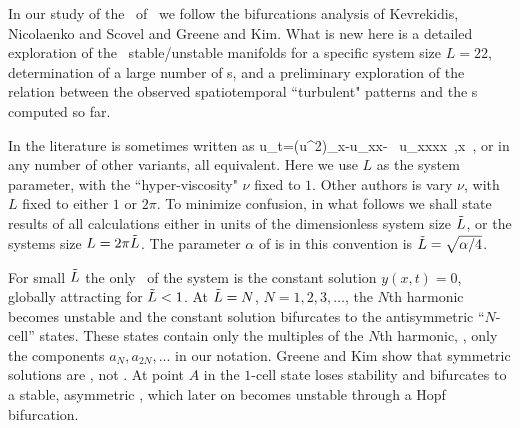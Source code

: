 In our study of the \eqva\ of
\KSe\ we follow the bifurcations analysis of
Kevrekidis, Nicolaenko and Scovel 
and
Greene and Kim. What is new here is
a detailed exploration of the \eqva\ stable/unstable manifolds
for a specific system size $L = 22$, determination
of a large number of \rpo s, and a preliminary
exploration of the relation between the
observed spatiotemporal ``turbulent" patterns and
the \rpo s computed so far.



In the literature  is sometimes written as
\beq
    u_t=(u^2)_x-u_{xx}- \nu \, u_{xxxx}
    \,,\qquad   x \in [0,L]
    \,,
or in any number of other variants, all equivalent.
Here we use
$L$ as the system parameter, with the ``hyper-viscosity" $\nu$ fixed to $1$.
Other authors is vary  $\nu$, with $L$ fixed to either $1$ or $2\pi$.
To minimize confusion,
in what follows we shall state results of all 
calculations either in units of the dimensionless system size $\tilde{L}$,
or the systems size $L = 2 \pi \tilde{L}$. The parameter $\alpha$
of  is in this convention is
$\tilde{L}=\sqrt{\alpha/4}$.


For small $\tilde{L}$ the only \eqv\ of the system is the constant solution $y(x,t)=0$,
globally attracting 
for $\tilde{L}<1$. At $\tilde{L}=N$, $N=1,2,3, \dots$, 
the $N$th harmonic becomes unstable and the constant solution
bifurcates to the antisymmetric ``$N$-cell'' states. 
These states contain only the multiples of the $N$th
harmonic, {\ie}, only the components $a_N,a_{2N},...$ in our notation.
Greene and Kim show that symmetric solutions are \eqva, not \reqva. 
At point $A$ in 
the $1$-cell state loses stability
and bifurcates to a stable, 
asymmetric \reqv, which later on becomes unstable through a Hopf bifurcation. 

